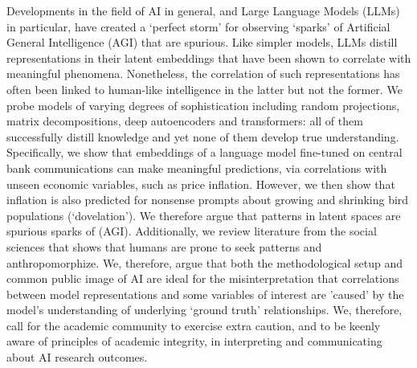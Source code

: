 Developments in the field of AI in general, and Large Language Models (LLMs) in particular, have created a `perfect storm’ for observing `sparks’ of Artificial General Intelligence (AGI) that are spurious. Like simpler models, LLMs distill representations in their latent embeddings that have been shown to correlate with meaningful phenomena. Nonetheless, the correlation of such representations has often been linked to human-like intelligence in the latter but not the former. We probe models of varying degrees of sophistication including random projections, matrix decompositions, deep autoencoders and transformers: all of them successfully distill knowledge and yet none of them develop true understanding. Specifically, we show that embeddings of a language model fine-tuned on central bank communications can make meaningful predictions, via correlations with unseen economic variables, such as price inflation. However, we then show that inflation is also predicted for nonsense prompts about growing and shrinking bird populations (`dovelation’). We therefore argue that patterns in latent spaces are spurious sparks of (AGI). Additionally, we review literature from the social sciences that shows that humans are prone to seek patterns and anthropomorphize. We, therefore, argue that both the methodological setup and common public image of AI are ideal for the misinterpretation that correlations between model representations and some variables of interest are 'caused' by the model's understanding of underlying `ground truth’ relationships. We, therefore, call for the academic community to exercise extra caution, and to be keenly aware of principles of academic integrity, in interpreting and communicating about AI research outcomes.